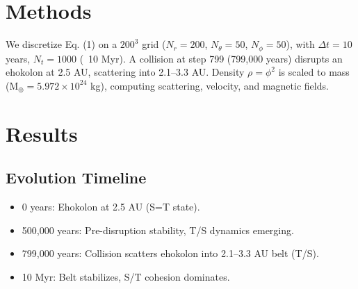 \documentclass[11pt]{article}
\begin{document}
\section{Methods}
We discretize Eq. (1) on a $200^3$ grid (\(N_r = 200\), \(N_\theta = 50\), \(N_\phi = 50\)), with \(\Delta t = 10\) years, \(N_t = 1000\) (~10 Myr). A collision at step 799 (799,000 years) disrupts an ehokolon at 2.5 AU, scattering into 2.1--3.3 AU. Density \(\rho = \phi^2\) is scaled to mass (M$_\oplus = 5.972 \times 10^{24}$ kg), computing scattering, velocity, and magnetic fields.

\section{Results}
\subsection{Evolution Timeline}
\begin{itemize}
    \item 0 years: Ehokolon at 2.5 AU (S=T state).
    \item 500,000 years: Pre-disruption stability, T/S dynamics emerging.
    \item 799,000 years: Collision scatters ehokolon into 2.1--3.3 AU belt (T/S).
    \item 10 Myr: Belt stabilizes, S/T cohesion dominates.
\end{itemize}
\end{document}
